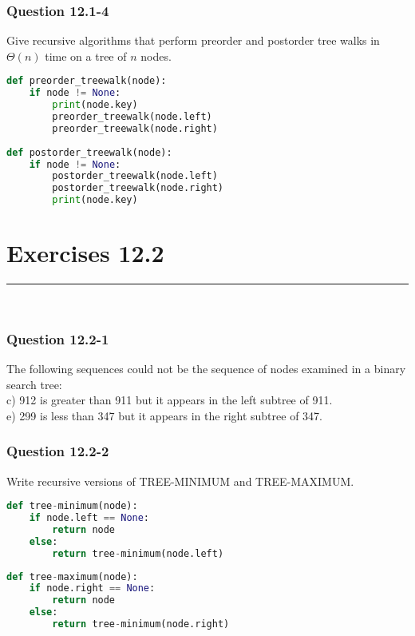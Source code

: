 \documentclass[11pt]{article}
\begin{document}
\subsubsection*{Question 12.1-4}\nointerlineskip
Give recursive algorithms that perform preorder and postorder tree walks in $\Theta(n)$ time on a tree of $n$ nodes.\\


\begin{minipage}{5in}
\begin{lstlisting}[language=Python]
def preorder_treewalk(node):
    if node != None:
        print(node.key)
        preorder_treewalk(node.left)
        preorder_treewalk(node.right)
        
def postorder_treewalk(node):
    if node != None:
        postorder_treewalk(node.left)
        postorder_treewalk(node.right)
        print(node.key)


\end{lstlisting}
\end{minipage}

\newpage
\section*{Exercises 12.2}\nointerlineskip
\noindent \rule{\linewidth}{0.01pt}\\

\subsubsection*{Question 12.2-1}\nointerlineskip
The following sequences could not be the sequence of nodes examined in a binary search tree:\\

c) 912 is greater than 911 but it appears in the left subtree of 911.\\
\indent e) 299 is less than 347 but it appears in the right subtree of 347.\\


\subsubsection*{Question 12.2-2}\nointerlineskip
Write recursive versions of TREE-MINIMUM and TREE-MAXIMUM.\\

\begin{minipage}{6in}
\begin{lstlisting}[language=Python]
def tree-minimum(node):
    if node.left == None:
        return node
    else:
        return tree-minimum(node.left)
\end{lstlisting}

\begin{lstlisting}[language=Python]
def tree-maximum(node):
    if node.right == None:
        return node
    else:
        return tree-minimum(node.right)
\end{lstlisting}
\end{minipage}
\end{document}
